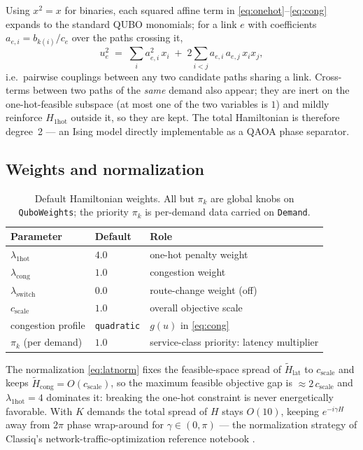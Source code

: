 \documentclass[11pt]{article}
\newcommand{\onehot}{\mathrm{1hot}}
\newcommand{\lat}{\mathrm{lat}}
\newcommand{\cng}{\mathrm{cong}}
\newcommand{\switch}{\mathrm{switch}}
\begin{document}
Using $x^2 = x$ for binaries, each squared affine term in
\eqref{eq:onehot}--\eqref{eq:cong} expands to the standard QUBO monomials; for
a link $e$ with coefficients $a_{e,i} = b_{k(i)}/c_e$ over the paths crossing
it,
\begin{equation}
  u_e^2 \;=\; \sum_i a_{e,i}^2\, x_i \;+\; 2 \sum_{i<j} a_{e,i}\, a_{e,j}\, x_i x_j ,
\end{equation}
i.e.\ pairwise couplings between any two candidate paths sharing a link.
Cross-terms between two paths of the \emph{same} demand also appear; they are
inert on the one-hot-feasible subspace (at most one of the two variables is
$1$) and mildly reinforce $H_{\onehot}$ outside it, so they are kept. The
total Hamiltonian is therefore degree~2 --- an Ising model directly
implementable as a QAOA phase separator.

\subsection{Weights and normalization}
\label{sec:weights}

\begin{table}[ht]
\centering
\begin{tabular}{lll}
\toprule
Parameter & Default & Role \\
\midrule
$\lambda_{\onehot}$        & $4.0$ & one-hot penalty weight \\
$\lambda_{\cng}$          & $1.0$ & congestion weight \\
$\lambda_{\switch}$        & $0.0$ & route-change weight (off) \\
$c_{\mathrm{scale}}$       & $1.0$ & overall objective scale \\
congestion profile         & \texttt{quadratic} & $g(u)$ in \eqref{eq:cong} \\
$\pi_k$ (per demand)       & $1.0$ & service-class priority: latency multiplier \\
\bottomrule
\end{tabular}
\caption{Default Hamiltonian weights. All but $\pi_k$ are global knobs on
\texttt{QuboWeights}; the priority $\pi_k$ is per-demand data carried on
\texttt{Demand}.}
\label{tab:weights}
\end{table}

The normalization \eqref{eq:latnorm} fixes the feasible-space spread of
$\widetilde{H}_{\lat}$ to $c_{\mathrm{scale}}$ and keeps
$\widetilde{H}_{\cng} = O(c_{\mathrm{scale}})$, so the maximum feasible
objective gap is $\approx 2\,c_{\mathrm{scale}}$ and
$\lambda_{\onehot} = 4$ dominates it: breaking the one-hot constraint is
never energetically favorable. With $K$ demands the total spread of $H$ stays
$O(10)$, keeping $e^{-i\gamma H}$ away from $2\pi$ phase wrap-around for
$\gamma \in (0,\pi)$ --- the normalization strategy of Classiq's
network-traffic-optimization reference notebook \cite{classiqtelecom}.
\end{document}
